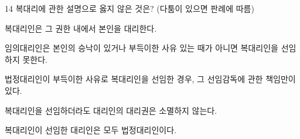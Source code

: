 \begin{question}{14}
복대리에 관한 설명으로 옳지 않은 것은? (다툼이 있으면 판례에 따름)
\begin{choices}
  \item 복대리인은 그 권한 내에서 본인을 대리한다.
  \item 임의대리인은 본인의 승낙이 있거나 부득이한 사유 있는 때가 아니면 복대리인을 선임하지 못한다.
  \item 법정대리인이 부득이한 사유로 복대리인을 선임한 경우, 그 선임감독에 관한 책임만이 있다.
  \item 복대리인을 선임하더라도 대리인의 대리권은 소멸하지 않는다.
  \item 복대리인이 선임한 대리인은 모두 법정대리인이다.
\end{choices}
\end{question}
